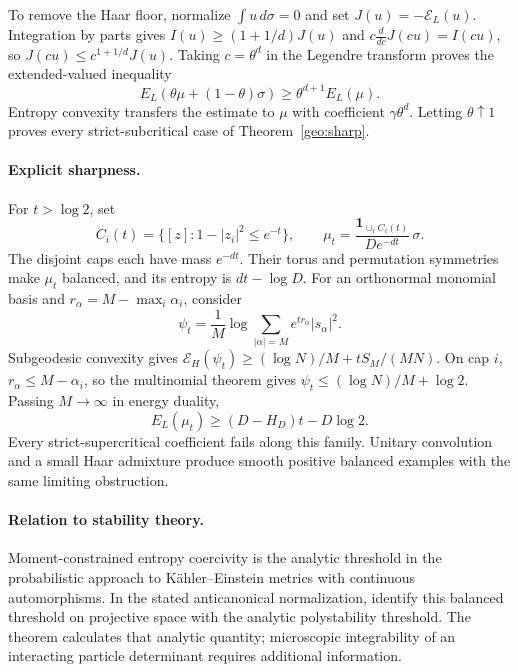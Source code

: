 To remove the Haar floor, normalize \(\int u\,d\sigma=0\) and set
\(J(u)=-\mathcal E_L(u)\). Integration by parts gives
\(I(u)\ge(1+1/d)J(u)\) and \(c\frac{d}{dc}J(cu)=I(cu)\), so
\(J(cu)\le c^{1+1/d}J(u)\). Taking \(c=\theta^d\) in the Legendre
transform proves the extended-valued inequality
\begin{equation}
 E_L(\theta\mu+(1-\theta)\sigma)\ge\theta^{d+1}E_L(\mu).
 \label{geo:dilution}
\end{equation}
Entropy convexity transfers the estimate to \(\mu\) with coefficient
\(\gamma\theta^d\). Letting \(\theta\uparrow1\) proves every
strict-subcritical case of Theorem~\ref{geo:sharp}.

\paragraph{Explicit sharpness.}
For \(t>\log2\), set
\[
 C_i(t)=\{[z]:1-|z_i|^2\le e^{-t}\},\qquad
 \mu_t=\frac{\mathbf1_{\cup_i C_i(t)}}{De^{-dt}}\,\sigma.
\]
The disjoint caps each have mass \(e^{-dt}\). Their torus and permutation
symmetries make \(\mu_t\) balanced, and its entropy is \(dt-\log D\).
For an orthonormal monomial basis and \(r_\alpha=M-\max_i\alpha_i\),
consider
\[
 \psi_t=\frac1M\log\sum_{|\alpha|=M}e^{tr_\alpha}|s_\alpha|^2.
\]
Subgeodesic convexity gives
\(\mathcal E_H(\psi_t)\ge(\log N)/M+tS_M/(MN)\). On cap \(i\),
\(r_\alpha\le M-\alpha_i\), so the multinomial theorem gives
\(\psi_t\le(\log N)/M+\log2\). Passing \(M\to\infty\) in energy duality,
\[
 E_L(\mu_t)\ge(D-H_D)t-D\log2.
\]
Every strict-supercritical coefficient fails along this family. Unitary
convolution and a small Haar admixture produce smooth positive balanced
examples with the same limiting obstruction.

\paragraph{Relation to stability theory.}
Moment-constrained entropy coercivity is the analytic threshold in the
probabilistic approach to K\"ahler--Einstein metrics with continuous
automorphisms. In the stated anticanonical normalization,
\cite[Propositions 3.6 and 3.10]{AndreassonBermanSvensson2026} identify this balanced
threshold on projective space with the analytic polystability threshold.
The theorem calculates that analytic quantity; microscopic integrability
of an interacting particle determinant requires additional information.




